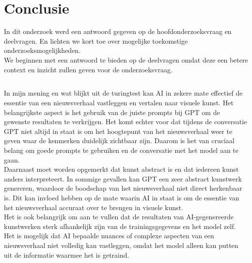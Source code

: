 
\chapter{Conclusie}%
\label{ch:conclusie}
In dit onderzoek werd een antwoord gegeven op de hoofdonderzoeksvraag en deelvragen. En lichten we kort toe over mogelijke toekomstige onderzoeksmogelijkheden.  \\

We beginnen met een antwoord te bieden op de deelvragen omdat deze een betere context en inzicht zullen geven voor de onderzoeksvraag. 

\section{}%

In mijn mening en wat blijkt uit de turingtest kan AI in zekere mate effectief de essentie van een nieuwsverhaal vastleggen en vertalen naar visuele kunst. Het belangrijkste aspect is het gebruik van de juiste prompts bij GPT om de gewenste resultaten te verkrijgen. Het komt echter voor dat tijdens de conversatie GPT niet altijd in staat is om het hoogtepunt van het nieuwsverhaal weer te geven waar de kenmerken duidelijk zichtbaar zijn. Daarom is het van cruciaal belang om goede prompts te gebruiken en de conversatie met het model aan te gaan. \\

Daarnaast moet worden opgemerkt dat kunst abstract is en dat iedereen kunst anders interpreteert. In sommige gevallen kan GPT een zeer abstract kunstwerk genereren, waardoor de boodschap van het nieuwsverhaal niet direct herkenbaar is. Dit kan invloed hebben op de mate waarin AI in staat is om de essentie van het nieuwsverhaal accuraat over te brengen in visuele kunst. \\

Het is ook belangrijk om aan te vullen dat de resultaten van AI-gegenereerde kunstwerken sterk afhankelijk zijn van de trainingsgegevens en het model zelf. Het is mogelijk dat AI bepaalde nuances of complexe aspecten van een nieuwsverhaal niet volledig kan vastleggen, omdat het model alleen kan putten uit de informatie waarmee het is getraind. \\

